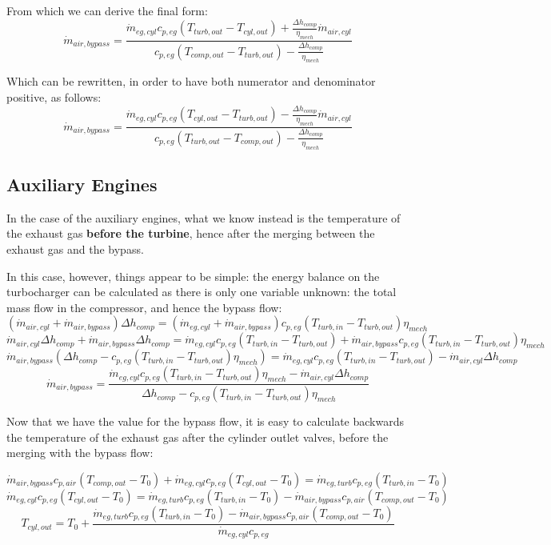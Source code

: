 From which we can derive the final form:
\begin{equation}
\dot{m}_{air,bypass} = \frac{\dot{m}_{eg,cyl} c_{p,eg} (T_{turb,out} - T_{cyl,out}) + \frac{\Delta h_{comp}}{\eta_{mech}}\dot{m}_{air,cyl}}{c_{p,eg} (T_{comp,out} - T_{turb,out}) - \frac{\Delta h_{comp}}{\eta_{mech}}} 
\end{equation}

Which can be rewritten, in order to have both numerator and denominator positive, as follows:
\begin{equation}
\dot{m}_{air,bypass} = \frac{\dot{m}_{eg,cyl} c_{p,eg} (T_{cyl,out} - T_{turb,out}) - \frac{\Delta h_{comp}}{\eta_{mech}}\dot{m}_{air,cyl}}{c_{p,eg} (T_{turb,out} - T_{comp,out}) - \frac{\Delta h_{comp}}{\eta_{mech}}} 
\end{equation}



\subsection{Auxiliary Engines}

In the case of the auxiliary engines, what we know instead is the temperature of the exhaust gas \textbf{before the turbine}, hence after the merging between the exhaust gas and the bypass.

In this case, however, things appear to be simple: the energy balance on the turbocharger can be calculated as there is only one variable unknown: the total mass flow in the compressor, and hence the bypass flow:
$$
(\dot{m}_{air,cyl} + \dot{m}_{air,bypass}) \Delta h_{comp} = (\dot{m}_{eg,cyl} + \dot{m}_{air,bypass}) c_{p,eg} (T_{turb,in} - T_{turb,out}) \eta_{mech}
$$
$$
\dot{m}_{air,cyl} \Delta h_{comp} + \dot{m}_{air,bypass} \Delta h_{comp} = \dot{m}_{eg,cyl} c_{p,eg} (T_{turb,in} - T_{turb,out}) + \dot{m}_{air,bypass} c_{p,eg} (T_{turb,in} - T_{turb,out}) \eta_{mech}
$$
$$
\dot{m}_{air,bypass} (\Delta h_{comp} - c_{p,eg} (T_{turb,in} - T_{turb,out}) \eta_{mech}) = \dot{m}_{eg,cyl} c_{p,eg} (T_{turb,in} - T_{turb,out}) - \dot{m}_{air,cyl} \Delta h_{comp}
$$
\begin{equation}
\dot{m}_{air,bypass} = \frac{\dot{m}_{eg,cyl} c_{p,eg} (T_{turb,in} - T_{turb,out}) \eta_{mech} - \dot{m}_{air,cyl} \Delta h_{comp}}{\Delta h_{comp} - c_{p,eg} (T_{turb,in} - T_{turb,out}) \eta_{mech}}
\end{equation}

Now that we have the value for the bypass flow, it is easy to calculate backwards the temperature of the exhaust gas after the cylinder outlet valves, before the merging with the bypass flow:

$$
\dot{m}_{air,bypass} c_{p,air} (T_{comp,out} - T_0) + \dot{m}_{eg,cyl} c_{p,eg}  (T_{cyl,out} - T_0) = \dot{m}_{eg,turb} c_{p,eg} (T_{turb,in} - T_0)
$$
$$
\dot{m}_{eg,cyl} c_{p,eg}  (T_{cyl,out} - T_0) = \dot{m}_{eg,turb} c_{p,eg} (T_{turb,in} - T_0) - \dot{m}_{air,bypass} c_{p,air} (T_{comp,out} - T_0)
$$
\begin{equation}
T_{cyl,out} = T_0 + \frac{\dot{m}_{eg,turb} c_{p,eg} (T_{turb,in} - T_0) - \dot{m}_{air,bypass} c_{p,air} (T_{comp,out} - T_0)}{\dot{m}_{eg,cyl} c_{p,eg}}
\end{equation}